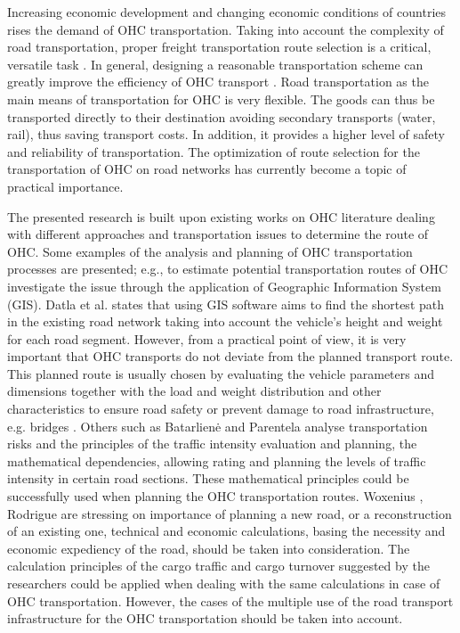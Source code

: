 %

Increasing economic development and changing economic conditions of countries rises the demand of OHC transportation. Taking into account the complexity of road transportation, proper freight transportation route selection is a critical, versatile task \cite{Bazaras.2013, xu2001methodology, sivilevicius2007dynamics}. In general, designing a reasonable transportation scheme can greatly improve the efficiency of OHC transport \cite{meng2015optimized}. Road transportation as the main means of transportation for OHC is very flexible. The goods can thus be transported directly to their destination avoiding secondary transports (water, rail), thus saving transport costs. In addition, it provides a higher level of safety and reliability of transportation. The optimization of route selection for the transportation of OHC on road networks has currently become a topic of practical importance\cite{geisberger2011efficient}.
\par The presented research is built upon existing works on OHC literature dealing with different approaches and transportation issues to determine the route of OHC. Some examples of the analysis and planning of OHC transportation processes are presented; e.g., to estimate potential transportation routes of OHC \cite{durham2002gis} investigate the issue through the application of Geographic Information System (GIS). Datla et al. \cite{datla2004gis} states that using GIS software aims to find the shortest path in the existing road network taking into account the vehicle’s height and weight for each road segment. However, from a practical point of view, it is very important that OHC transports do not deviate from the planned transport route. This planned route is usually chosen by evaluating the vehicle parameters and dimensions together with the load and weight distribution and other characteristics to ensure road safety or prevent damage to road infrastructure, e.g. bridges \cite{ecmt2006improving, vaitkus2016effect, kombe2017modelling, pauer2017development}.
Others such as Batarlienė \cite{batarliene2007mobile} and Parentela \cite{parentela2002risk} analyse transportation risks and the principles of the traffic intensity evaluation and planning, the mathematical dependencies, allowing rating and planning the levels of traffic intensity in certain road sections. These mathematical principles could be successfully used when planning the OHC transportation routes. Woxenius \cite{woxenius2002organisation, woxenius2002conceptual}, Rodrigue \cite{rodrigue2020geography}are stressing on importance of planning a new road, or a reconstruction of an existing one, technical and economic calculations, basing the necessity and economic expediency of the road, should be taken into consideration. The calculation principles of the cargo traffic and cargo turnover suggested by the researchers could be applied when dealing with the same calculations in case of OHC  transportation. However, the cases of the multiple use of the road transport infrastructure for the OHC transportation should be taken into account. 

